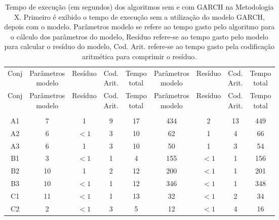 \begin{center}
\begin{longtable}{ccccc|cccc}
\toprule
\rowcolor{white}
\caption[Metodologia X: tempo de execução]{Tempo de execução (em segundos)
dos algoritmos sem e com GARCH na Metodologia X. Primeiro é exibido o tempo de
execução sem a utilização do modelo GARCH, depois com o modelo. Parâmetros
modelo se refere ao tempo gasto pelo algoritmo para o cálculo dos parâmetros do
modelo, Resíduo refere-se ao tempo gasto pelo modelo para calcular o resíduo do
modelo, Cod. Arit. refere-se ao tempo gasto pela codificação aritmética para
comprimir o resíduo.} \label{tab:EvolucaoEntropiaMet10}\\
\midrule
Conj & \specialcell{Parâmetros\\modelo} &
Resíduo & \specialcell{Cod.\\Arit.} & \specialcell{Tempo\\total} &
\specialcell{Parâmetros\\modelo} &
Resíduo & \specialcell{Cod.\\Arit.} & \specialcell{Tempo\\total} \\
\midrule
\endfirsthead 
\midrule
\rowcolor{white}
Conj & \specialcell{Parâmetros\\modelo} &
Resíduo & \specialcell{Cod.\\Arit.} & \specialcell{Tempo\\total} &
\specialcell{Parâmetros\\modelo} &
Resíduo & \specialcell{Cod.\\Arit.} & \specialcell{Tempo\\total} \\
\toprule
\endhead
\midrule \\ %
\endfoot
\bottomrule 
\endlastfoot
A1&7&1&9&17&434&2&13&449\\
A2&6&$<1$&3&10&62&1&4&66\\
A3&6&1&3&10&50&1&3&54\\
B1&3&$<1$&1&4&155&$<1$&1&156\\
B2&10&1&2&12&200&$<1$&1&201\\
B3&10&$<1$&1&12&346&$<1$&1&348\\
C1&11&$<1$&1&13&32&$<1$&2&34\\
C2&2&$<1$&3&5&12&$<1$&4&16\\

\end{longtable}
\end{center}
